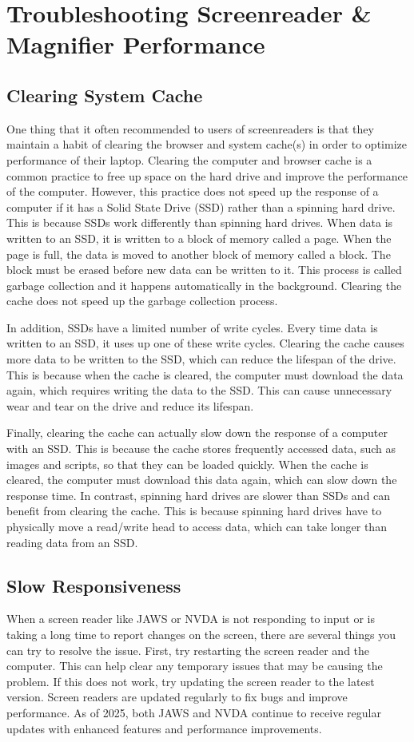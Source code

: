 \chapter{Troubleshooting Screenreader \& Magnifier Performance}\label{troubleshooting}

\section{Clearing System Cache}\label{cache}
One thing that it often recommended to users of screenreaders is that they maintain a habit of clearing the browser and system cache(s) in order to optimize performance of their laptop. Clearing the computer and browser cache is a common practice to free up space on the hard drive and improve the performance of the computer. However, this practice does not speed up the response of a computer if it has a Solid State Drive (SSD) rather than a spinning hard drive. This is because SSDs work differently than spinning hard drives. When data is written to an SSD, it is written to a block of memory called a page. When the page is full, the data is moved to another block of memory called a block. The block must be erased before new data can be written to it. This process is called garbage collection and it happens automatically in the background. Clearing the cache does not speed up the garbage collection process.

In addition, SSDs have a limited number of write cycles. Every time data is written to an SSD, it uses up one of these write cycles. Clearing the cache causes more data to be written to the SSD, which can reduce the lifespan of the drive. This is because when the cache is cleared, the computer must download the data again, which requires writing the data to the SSD. This can cause unnecessary wear and tear on the drive and reduce its lifespan.

Finally, clearing the cache can actually slow down the response of a computer with an SSD. This is because the cache stores frequently accessed data, such as images and scripts, so that they can be loaded quickly. When the cache is cleared, the computer must download this data again, which can slow down the response time. In contrast, spinning hard drives are slower than SSDs and can benefit from clearing the cache. This is because spinning hard drives have to physically move a read/write head to access data, which can take longer than reading data from an SSD.

\section{Slow Responsiveness}\label{response}
When a screen reader like JAWS or NVDA is not responding to input or is taking a long time to report changes on the screen, there are several things you can try to resolve the issue. First, try restarting the screen reader and the computer. This can help clear any temporary issues that may be causing the problem. If this does not work, try updating the screen reader to the latest version. Screen readers are updated regularly to fix bugs and improve performance. As of 2025, both JAWS and NVDA continue to receive regular updates with enhanced features and performance improvements.


